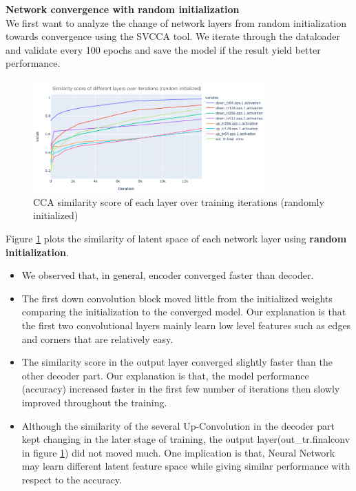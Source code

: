\textbf{Network convergence with random initialization}\\

We first want to analyze the change of network layers from random initialization towards convergence using the SVCCA tool. We iterate through the dataloader and validate every 100 epochs and save the model if the result yield better performance.\\
\begin{figure}
	\centering
	\includegraphics[width=0.8\textwidth]{img/SVCCA/CCA_score_scratch.png}
	\caption{CCA similarity score of each layer over training iterations (randomly initialized)}
	\label{fig:random_init_converge}
\end{figure}

Figure \ref{fig:random_init_converge} plots the similarity of latent space of each network layer using \textbf{random initialization}. 
\begin{itemize}
	\item We observed that, in general, encoder converged faster than decoder.
	\item The first down convolution block moved little from the initialized weights comparing the initialization to the converged model. Our explanation is that the first two convolutional layers mainly learn low level features such as edges and corners that are relatively easy.
	\item The similarity score in the output layer converged slightly faster than the other decoder part. Our explanation is that, the model performance (accuracy) increased faster in the first few number of iterations then slowly improved throughout the training.
	\item Although the similarity of the several Up-Convolution in the decoder part kept changing in the later stage of training, the output layer(out\_tr.finalconv in figure \ref{fig:random_init_converge}) did not moved much. One implication is that, Neural Network may learn different latent feature space while giving similar performance with respect to the accuracy. 
	\end{itemize}

